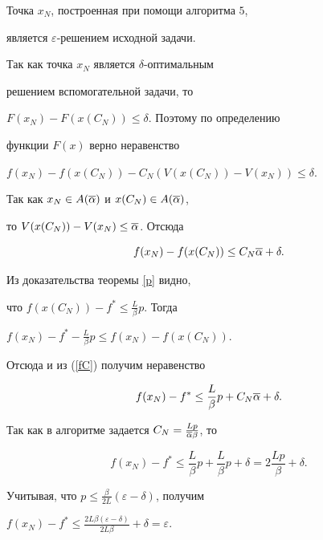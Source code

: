 \begin{thm}


Точка $x_N$, построенная при помощи алгоритма $5$,


является $\varepsilon$-решением исходной задачи.


\end{thm}





\begin{pf}


Так как точка $x_N$ является $\delta$-оптимальным 


решением вспомогательной задачи, то


$F(x_N)-F(x(C_N))\leq\delta$. Поэтому по определению 


функции $F(x)$ верно неравенство


$f(x_N)-f(x(C_N))-C_N(V(x(C_N))-V(x_N))\leq\delta$.


Так как $x_N\in A(\overline\alpha)$ и $x(C_N)\in A(\overline\alpha)$,


то $V(x(C_N))-V(x_N)\leq\overline\alpha$. Отсюда


\begin{equation}\label{fC}


f(x_N)-f(x(C_N))\leq C_N\o\alpha+\delta.


\end{equation}


Из доказательства теоремы \ref{p} видно, 


что $f(x(C_N))-f^*\leq\frac{L}{\beta}p$. Тогда


$f(x_N)-f^*-\frac{L}{\beta}p\leq f(x_N)-f(x(C_N))$. 


Отсюда и из (\ref{fC}) получим неравенство


$$


f(x_N)-f^*\leq\frac{L}{\beta}p+C_N\o\alpha+\delta.


$$


Так как в алгоритме задается $C_N=\frac{Lp}{\overline\alpha\beta}$, то


$$f(x_N)-f^*\leq\frac{L}{\beta}p+\frac{L}{\beta}p+\delta =


2\frac{Lp}{\beta}+\delta.


$$


Учитывая, что $p\leq\frac{\beta}{2L}(\varepsilon-\delta)$, получим


$f(x_N)-f^*\leq\frac{2L\beta(\varepsilon-\delta)}{2L\beta}+\delta =


\varepsilon$.


\end{pf}






